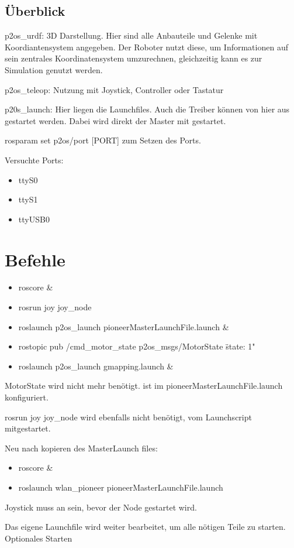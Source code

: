 \documentclass{scrartcl}%
\begin{document}
\subsection{Überblick}
p2os\_urdf: 3D Darstellung. Hier sind alle Anbauteile und Gelenke mit Koordiantensystem angegeben. Der Roboter nutzt diese, um Informationen auf sein zentrales Koordinatensystem umzurechnen, gleichzeitig kann es zur Simulation genutzt werden.

p2os\_teleop: Nutzung mit Joystick, Controller oder Tastatur

p20s\_launch: Hier liegen die Launchfiles. Auch die Treiber können von hier aus gestartet werden. Dabei wird direkt der Master mit gestartet.

rosparam set p2os/port [PORT] zum Setzen des Ports.

Versuchte Ports: 
\begin{itemize}
	\item ttyS0
	\item ttyS1
	\item ttyUSB0
\end{itemize}

\section{Befehle}

\begin{itemize}
	\item roscore \&
	\item rosrun joy joy\_node
	\item roslaunch p2os\_launch pioneerMasterLaunchFile.launch \&
	\item rostopic pub /cmd\_motor\_state p2os\_msgs/MotorState \"state: 1"
	\item roslaunch p2os\_launch gmapping.launch \&
\end{itemize}
MotorState wird nicht mehr benötigt. ist im pioneerMasterLaunchFile.launch konfiguriert.

rosrun joy joy\_node wird ebenfalls nicht benötigt, vom Launchscript mitgestartet.

Neu nach kopieren des MasterLaunch files:
\begin{itemize}
	\item roscore \&
	\item roslaunch wlan\_pioneer pioneerMasterLaunchFile.launch
\end{itemize}
Joystick muss an sein, bevor der Node gestartet wird.

Das eigene Launchfile wird weiter bearbeitet, um alle nötigen Teile zu starten. Optionales Starten 
\end{document}
